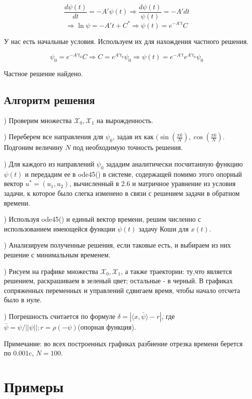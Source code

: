 \documentclass{article}
\theoremstyle{definition}
\begin{document}
$$\frac{d\psi(t)}{dt} = -A'\psi(t) \Rightarrow \frac{d\psi(t)}{\psi(t)} = -A'dt$$
$$\Rightarrow \ln\psi = -A't+C^* \Rightarrow \psi(t) = e^{-A't}C$$

У нас есть начальные условия. Используем их для нахождения частного решения.

$$\psi_0 = e^{-A't_0}C \Rightarrow C = e^{A't_0}\psi_0 \Rightarrow \psi(t) = e^{-A't}e^{A't_0}\psi_0$$

Частное решение найдено.

\newpage
\subsection{Алгоритм решения}

) Проверим множества $\mathcal{X}_0, \mathcal{X}_1$ на вырожденность.

) Переберем все направления для $\psi_0$, задав их как $(\sin(\frac{\pi k}{N}), \cos(\frac{\pi k}{N})$.
Подгоним величину $N$ под необходимую точность решения.

) Для каждого из направлений $\psi_0$ зададим аналитически посчитанную функцию $\psi(t)$ и передадим ее в 
ode45() в системе, содержащей помимо этого опорный вектор $u^* = (u_1,u_2)$, вычисленный в 2.6 и матричное уравнение из условия задачи, к 
которое было слегка изменено в связи с решением задачи в обратном времени. 

) Используя ode45() и единый вектор времени, решим численно с использованием имеющейся функции $\psi(t)$
задачу Коши для $x(t)$.

) Анализируем полученные решения, если таковые есть, и выбираем из них решение с минимальным временем.

) Рисуем на графике множества $\mathcal{X}_0, \mathcal{X}_1$, а также траектории:
ту,что является решением, раскрашиваем в зеленый цвет; остальные - в черный. В графиках сопряженных переменных и управлений
сдвигаем время, чтобы начало отсчета было в нуле.

) Погрешность считается по формуле $\delta = |\langle x,\bar \psi \rangle - r|$, где $\bar\psi = \psi/||\psi||; r = \rho(-\psi)$(опорная функция).

\noindent Примечание: во всех построенных графиках разбиение отрезка времени берется по $0.001$c, $N = 100$.

\newpage

\section{Примеры}
\end{document}

